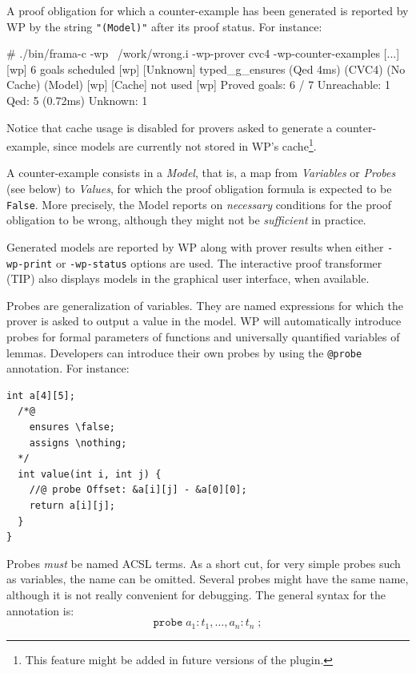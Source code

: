 A proof obligation for which a counter-example has been generated is reported by
\textsf{WP} by the string \verb+"(Model)"+ after its proof status. For instance:

\begin{shell}
# ./bin/frama-c -wp ~/work/wrong.i -wp-prover cvc4 -wp-counter-examples
[...]
[wp] 6 goals scheduled
[wp] [Unknown] typed_g_ensures (Qed 4ms) (CVC4) (No Cache) (Model)
[wp] [Cache] not used
[wp] Proved goals:    6 / 7
  Unreachable:     1
  Qed:             5 (0.72ms)
  Unknown:         1
\end{shell}

Notice that cache usage is disabled for provers asked to generate a
counter-example, since models are currently not stored in \textsf{WP}'s
cache\footnote{This feature might be added in future versions of the plugin.}.

A counter-example consists in a \emph{Model}, that is, a map from
\emph{Variables} or \emph{Probes} (see below) to \emph{Values}, for which the
proof obligation formula is expected to be \verb+False+. More precisely, the
Model reports on \emph{necessary} conditions for the proof obligation to be
wrong, although they might not be \emph{sufficient} in practice.

Generated models are reported by \textsf{WP} along with prover results when
either \verb+-wp-print+ or \verb+-wp-status+ options are used. The interactive
proof transformer (\textsf{TIP}) also displays models in the graphical user
interface, when available.

Probes are generalization of variables. They are named expressions for which the
prover is asked to output a value in the model. \textsf{WP} will automatically
introduce probes for formal parameters of functions and universally quantified
variables of lemmas. Developers can introduce their own probes by using the
\verb+@probe+ annotation. For instance:

\begin{lstlisting}[style=c]
  int a[4][5];
  /*@
    ensures \false;
    assigns \nothing;
  */
  int value(int i, int j) {
    //@ probe Offset: &a[i][j] - &a[0][0];
    return a[i][j];
  }
}
\end{lstlisting}

Probes \emph{must} be named \textsf{ACSL} terms.  As a short cut, for very
simple probes such as variables, the name can be omitted. Several probes might
have the same name, although it is not really convenient for debugging. The
general syntax for the annotation is:
\[
\mathtt{probe} \; a_1: t_1, \ldots, a_n: t_n \;\mathtt{;}
\]

